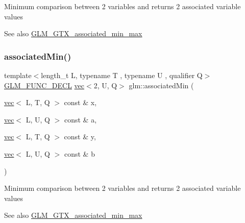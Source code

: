 Minimum comparison between 2 variables and returns 2 associated variable values \begin{DoxySeeAlso}{See also}
\mbox{\hyperlink{group__gtx__associated__min__max}{G\+L\+M\+\_\+\+G\+T\+X\+\_\+associated\+\_\+min\+\_\+max}} 
\end{DoxySeeAlso}
\mbox{\label{group__gtx__associated__min__max_gac2f0dff90948f2e44386a5eafd941d1c}} 
\subsubsection{\texorpdfstring{associated\+Min()}{associatedMin()}\hspace{0.1cm}{\footnotesize\ttfamily [2/10]}}
{\footnotesize\ttfamily template$<$length\+\_\+t L, typename T , typename U , qualifier Q$>$ \\
\mbox{\hyperlink{setup_8hpp_ab2d052de21a70539923e9bcbf6e83a51}{G\+L\+M\+\_\+\+F\+U\+N\+C\+\_\+\+D\+E\+CL}} \mbox{\hyperlink{structglm_1_1vec}{vec}}$<$2, U, Q$>$ glm\+::associated\+Min (\begin{DoxyParamCaption}\item[{\mbox{\hyperlink{structglm_1_1vec}{vec}}$<$ L, T, Q $>$ const \&}]{x,  }\item[{\mbox{\hyperlink{structglm_1_1vec}{vec}}$<$ L, U, Q $>$ const \&}]{a,  }\item[{\mbox{\hyperlink{structglm_1_1vec}{vec}}$<$ L, T, Q $>$ const \&}]{y,  }\item[{\mbox{\hyperlink{structglm_1_1vec}{vec}}$<$ L, U, Q $>$ const \&}]{b }\end{DoxyParamCaption})}

Minimum comparison between 2 variables and returns 2 associated variable values \begin{DoxySeeAlso}{See also}
\mbox{\hyperlink{group__gtx__associated__min__max}{G\+L\+M\+\_\+\+G\+T\+X\+\_\+associated\+\_\+min\+\_\+max}} 
\end{DoxySeeAlso}
\mbox{\label{group__gtx__associated__min__max_gacfec519c820331d023ef53a511749319}} 
